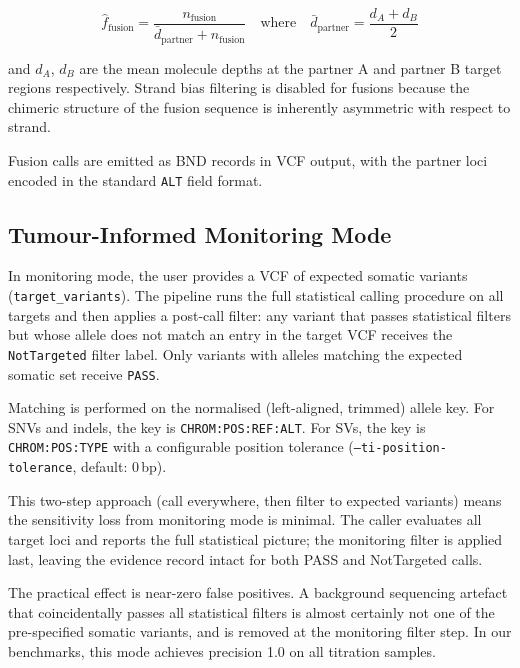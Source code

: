 \begin{equation}
  \label{eq:fusion-vaf}
  \hat{f}_\text{fusion} = \frac{n_\text{fusion}}{\bar{d}_\text{partner} + n_\text{fusion}}
  \quad \text{where} \quad
  \bar{d}_\text{partner} = \frac{d_A + d_B}{2}
\end{equation}

\noindent and $d_A$, $d_B$ are the mean molecule depths at the partner A and partner B target regions respectively. Strand bias filtering is disabled for fusions because the chimeric structure of the fusion sequence is inherently asymmetric with respect to strand.

Fusion calls are emitted as BND records in VCF output, with the partner loci encoded in the standard \texttt{ALT} field format.

\subsection{Tumour-Informed Monitoring Mode}
\label{sec:method:monitoring}

In monitoring mode, the user provides a VCF of expected somatic variants (\texttt{target\_variants}). The pipeline runs the full statistical calling procedure on all targets and then applies a post-call filter: any variant that passes statistical filters but whose allele does not match an entry in the target VCF receives the \texttt{NotTargeted} filter label. Only variants with alleles matching the expected somatic set receive \texttt{PASS}.

Matching is performed on the normalised (left-aligned, trimmed) allele key. For SNVs and indels, the key is \texttt{CHROM:POS:REF:ALT}. For SVs, the key is \texttt{CHROM:POS:TYPE} with a configurable position tolerance (\texttt{--ti-position-tolerance}, default: 0\,bp).

This two-step approach (call everywhere, then filter to expected variants) means the sensitivity loss from monitoring mode is minimal. The caller evaluates all target loci and reports the full statistical picture; the monitoring filter is applied last, leaving the evidence record intact for both PASS and NotTargeted calls.

The practical effect is near-zero false positives. A background sequencing artefact that coincidentally passes all statistical filters is almost certainly not one of the pre-specified somatic variants, and is removed at the monitoring filter step. In our benchmarks, this mode achieves precision 1.0 on all titration samples.

